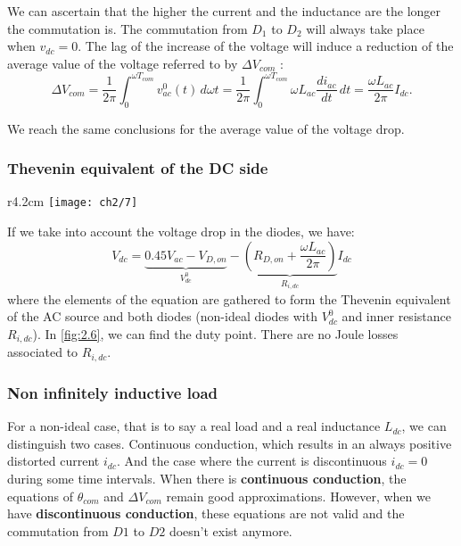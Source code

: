 			We can ascertain that the higher the current and the inductance are the longer the commutation is. The commutation from $D_1$ to $D_2$ will always take place when $v_{dc} = 0$. The lag of the increase of the voltage will induce a reduction of the average value of the voltage referred to by $\Delta V_{com}$ : 			
			\begin{equation}
				\Delta V_{com} = \frac{1}{2\pi} \int _0 ^{\omega T_{com}} v_{ac}^0(t) \, d\omega t = \frac{1}{2\pi} \int _0 ^{\omega T_{com}} \omega L_{ac}\frac{di_{ac}}{dt} \, dt = \frac{\omega L_{ac}}{2\pi} I_{dc}.
 			\end{equation}
 			
            We reach the same conclusions for the average value of the voltage drop.
 
 		\subsubsection{Thevenin equivalent of the DC side}
 			
			\begin{wrapfigure}[6]{r}{4.2cm}
			\vspace{-5mm}
			\texttt{[image: ch2/7]}
			\label{fig:2.6}
			\end{wrapfigure} 			
			
			If we take into account the voltage drop in the diodes, we have: 
 			\begin{equation}
 				V_{dc} = \underbrace{0.45 V_{ac} - V_{D,on}}_{V_{dc}^0} - \underbrace{(R_{D,on}+\frac{\omega L_{ac}}{2\pi})}_{R_{i,dc}} I_{dc}
			\end{equation} 	
			where the elements of the equation are gathered to form the Thevenin equivalent of the AC source and both diodes (non-ideal diodes with $V_{dc}^0$ and inner resistance $R_{i,dc}$). In \autoref{fig:2.6}, we can find the duty point. There are no Joule losses associated to $R_{i,dc}$. 
			
		\subsubsection{Non infinitely inductive load}
		
            For a non-ideal case, that is to say a real load and a real inductance $L_{dc}$, we can distinguish two cases. Continuous conduction, which results in an always positive distorted current $i_{dc}$. And the case where the current is discontinuous $i_{dc} = 0$ during some time intervals. When there is  \textbf{continuous conduction}, the equations of $\theta _{com}$ and $\Delta V_{com}$ remain good approximations. However, when we have \textbf{discontinuous conduction}, these equations are not valid and the commutation from $D1$ to $D2$ doesn't exist anymore. 
			
